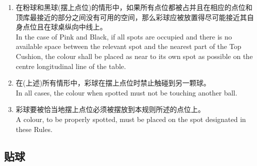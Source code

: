 \begin{enumerate}[label=(\alph*)]
    \item 在粉球和黑球(摆上点位)的情形中，如果所有点位都被占并且在相应的点位和顶库最接近的部分之间没有可用的空间，那么彩球应被放置得尽可能接近其自身点位且在球桌纵向中线上。\\
    In the case of Pink and Black, if all spots are occupied and there is no available space between the relevant spot and the nearest part of the Top Cushion, the colour shall be placed as near to its own spot as possible on the centre longitudinal line of the table.
    \item 在(上述)所有情形中，彩球在摆上点位时禁止触碰到另一颗球。\\
    In all cases, the colour when spotted must not be touching another ball.
    \item 彩球要被恰当地摆上点位必须被摆放到本规则所述的点位上。\\
    A colour, to be properly spotted, must be placed on the spot designated in these Rules.
\end{enumerate}

\subsection{贴球}

